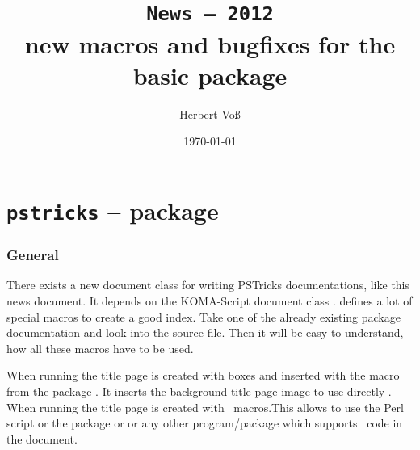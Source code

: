 \documentclass[11pt,english,BCOR10mm,DIV12,bibliography=totoc,parskip=false,smallheadings
    headexclude,footexclude,oneside]{pst-doc}
\let\Lfile\LFile
\begin{document}
\title{\texttt{News -- 2012}\\ \Large new macros and bugfixes for the
basic package }
\author{Herbert Voß}
\date{\today}

\maketitle

\clearpage
\tableofcontents

\clearpage
\part{\texttt{pstricks} -- package}

\section{General}
There exists a new document class  for writing PSTricks documentations,
like this news document. It depends on the KOMA-Script document class .
 defines a lot of special macros to create a good index. Take one of
the already existing package documentation and look into the source file. Then it will be
easy to understand, how all these macros have to be used.

When running  the title page is created with boxes and inserted 
with the macro  from the package . It
inserts the background title page image \Lfile{pst-doc-pdf} to use directly
.
When running  the title page
 is created with \PST\ macros.This allows to use the Perl script  or
the package  or  or any other program/package which
supports \PS\ code in the document.





\end{document}
